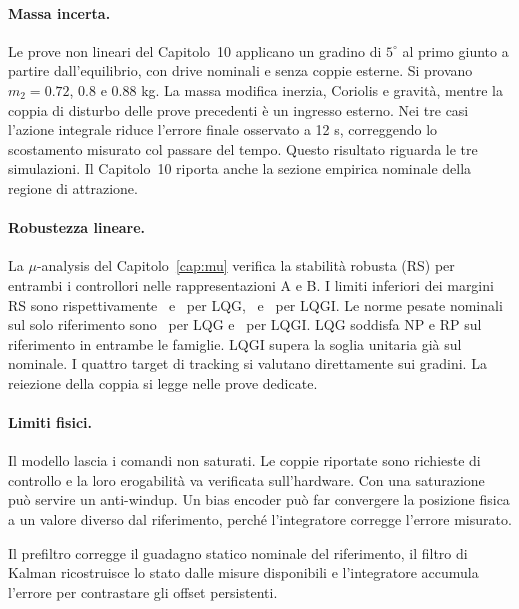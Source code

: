 \paragraph{Massa incerta.}
Le prove non lineari del Capitolo~10 applicano un gradino di $5^\circ$
al primo giunto a partire dall'equilibrio, con drive nominali e senza
coppie esterne. Si provano $m_2=0.72$, $0.8$ e $0.88$ kg. La massa
modifica inerzia, Coriolis e gravità, mentre la coppia di disturbo delle
prove precedenti è un ingresso esterno. Nei tre casi l'azione integrale
riduce l'errore finale osservato a 12 s, correggendo lo scostamento
misurato col passare del tempo. Questo risultato riguarda le tre
simulazioni. Il Capitolo~10 riporta anche la sezione empirica nominale
della regione di attrazione.

\paragraph{Robustezza lineare.}
La $\mu$-analysis del Capitolo~\ref{cap:mu} verifica la stabilità robusta (RS) per
entrambi i controllori nelle rappresentazioni A e B. I limiti inferiori
dei margini RS sono rispettivamente \FinLQGRSA\ e \FinLQGRSB\ per
LQG, \FinLQGIRSA\ e \FinLQGIRSB\ per LQGI. Le norme pesate
nominali sul solo riferimento sono \FinLQGNormaR\ per LQG e
\FinLQGINormaR\ per LQGI. LQG soddisfa NP e RP sul riferimento
in entrambe le famiglie. LQGI supera la soglia unitaria già sul
nominale. I quattro target di tracking si valutano direttamente
sui gradini. La reiezione della coppia si legge nelle prove dedicate.

\paragraph{Limiti fisici.}
Il modello lascia i comandi non saturati. Le coppie riportate sono
richieste di controllo e la loro erogabilità va verificata sull'hardware.
Con una saturazione può servire un anti-windup. Un bias encoder può
far convergere la posizione fisica a un valore diverso dal riferimento,
perché l'integratore corregge l'errore misurato.

Il prefiltro corregge il guadagno statico nominale del riferimento,
il filtro di Kalman ricostruisce lo stato dalle misure disponibili
e l'integratore accumula l'errore per contrastare gli offset persistenti.
